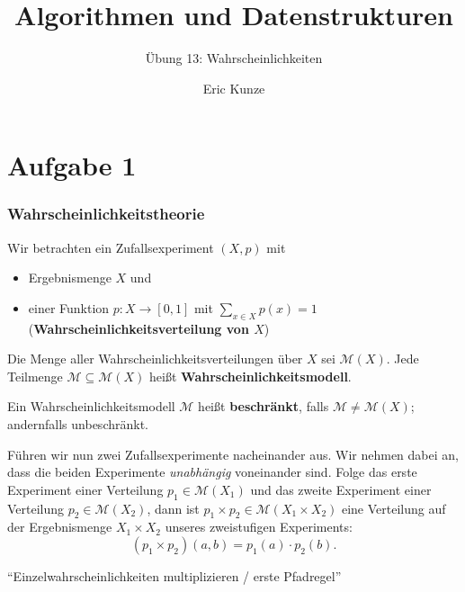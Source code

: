 \documentclass{beamer}
\begin{document}
	
	\title{Algorithmen und Datenstrukturen}
	\subtitle{Übung 13: Wahrscheinlichkeiten}
	\author{Eric Kunze}
	\date{}

	\maketitle


\section{Aufgabe 1}

\begin{frame} \frametitle{Wahrscheinlichkeitstheorie}
	\justifying \footnotesize
	Wir betrachten ein Zufallsexperiment $(X,p)$ mit
	\begin{itemize}
		\item Ergebnismenge $X$ und
		\item einer Funktion $p \colon X \to [0,1]$ mit $\sum_{x \in X} p(x) = 1$ (\textbf{Wahrscheinlichkeitsverteilung von $X$})
	\end{itemize}
	\pause
	
	Die Menge aller Wahrscheinlichkeitsverteilungen über $X$ sei $\mathcal{M}(X)$. Jede Teilmenge $\mathcal{M} \subseteq \mathcal{M}(X)$ heißt \textbf{Wahrscheinlichkeitsmodell}.
	\pause
	
	Ein Wahrscheinlichkeitsmodell $\mathcal{M}$ heißt \textbf{beschränkt}, falls $\mathcal{M} \neq \mathcal{M}(X)$; andernfalls unbeschränkt.
	\pause
	
	Führen wir nun zwei Zufallsexperimente nacheinander aus. Wir nehmen dabei an, dass die beiden Experimente \textit{unabhängig} voneinander sind. Folge das erste Experiment einer Verteilung $p_1 \in \mathcal{M}(X_1)$ und das zweite Experiment einer Verteilung $p_2 \in \mathcal{M}(X_2)$, dann ist $p_1 \times p_2 \in \mathcal{M}(X_1 \times X_2)$ eine Verteilung auf der Ergebnismenge $X_1 \times X_2$ unseres zweistufigen Experiments:
	\begin{equation*}
		(p_1 \times p_2)(a,b) = p_1(a) \cdot p_2(b) .
	\end{equation*}
	\begin{center}
		\enquote{Einzelwahrscheinlichkeiten multiplizieren / erste Pfadregel}
	\end{center}
\end{frame}
\end{document}
